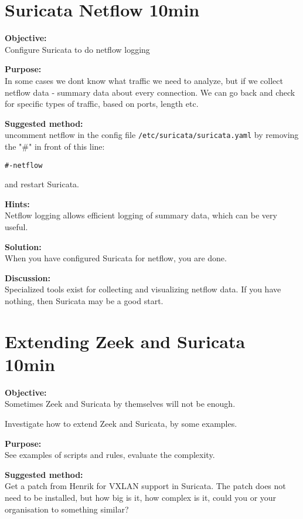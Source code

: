 \documentclass[a4paper,11pt,notitlepage]{report}
\begin{document}
\chapter{Suricata Netflow 10min}
\label{ex:suricatanetflow}


{\bf Objective:} \\
Configure Suricata to do netflow logging


{\bf Purpose:}\\
In some cases we dont know what traffic we need to analyze, but if we collect netflow data - summary data about every connection. We can go back and check for specific types of traffic, based on ports, length etc.


{\bf Suggested method:}\\

uncomment netflow in the config file \verb+/etc/suricata/suricata.yaml+
by removing the "\#" in front of this line:

\begin{alltt}
#- netflow
\end{alltt}

and restart Suricata.


{\bf Hints:}\\
Netflow logging allows efficient logging of summary data, which can be very useful.


{\bf Solution:}\\
When you have configured Suricata for netflow, you are done.


{\bf Discussion:}\\
Specialized tools exist for collecting and visualizing netflow data. If you have nothing, then Suricata may be a good start.


\chapter{Extending Zeek and Suricata 10min}
\label{ex:}


{\bf Objective:} \\
Sometimes Zeek and Suricata by themselves will not be enough.

Investigate how to extend Zeek and Suricata, by some examples.

{\bf Purpose:}\\
See examples of scripts and rules, evaluate the complexity.


{\bf Suggested method:}\\
Get a patch from Henrik for VXLAN support in Suricata. The patch does not need to be installed, but how big is it, how complex is it, could you or your organisation to something similar?
\end{document}

